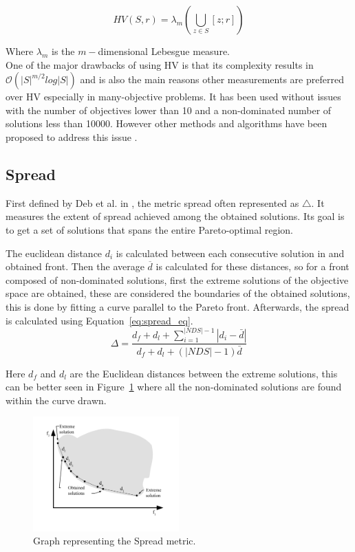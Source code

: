 \begin{equation}
H V(S, r)=\lambda_{m}\left(\bigcup_{z \in S}[z ; r]\right)
\end{equation}

Where $\lambda_m$ is the $m-$dimensional Lebesgue measure.\\

One of the major drawbacks of using HV is that its complexity results in $\mathcal{O}(|S|^{m/2}log|S|)$ and is also the main reasons other measurements are preferred over HV especially in many-objective problems. It has been used without issues with the number of objectives lower than 10 and a non-dominated number of solutions less than 10000. However other methods and algorithms have been proposed to address this issue \cite{audet2018performance}.

\subsection{Spread}

First defined by Deb et al. in \cite{zitzler2003performance}, the metric spread often represented as $\bigtriangleup$. It measures the extent of spread achieved among the obtained solutions. Its goal is to get a set of solutions that spans the entire Pareto-optimal region.

The euclidean distance $d_i$ is calculated between each consecutive solution in and obtained front. Then the average $\overline{d}$ is calculated for these distances, so for a front composed of non-dominated solutions, first the extreme solutions of the objective space are obtained, these are considered the boundaries of the obtained solutions, this is done by fitting a curve parallel to the Pareto front. Afterwards, the spread is calculated using Equation~\ref{eq:spread_eq}.\\

\begin{equation}
\Delta=\frac{d_{f}+d_{l}+\sum_{i=1}^{|N D S|-1}\left|d_{i}-\bar{d}\right|}{d_{f}+d_{l}+(|N D S|-1) \bar{d}}
\label{eq:spread_eq}
\end{equation}

Here $d_f$ and $d_l$ are the Euclidean distances between the extreme solutions, this can be better seen in Figure~\ref{fig:spread_graph} where all the non-dominated solutions are found within the curve drawn.\\

\begin{figure}
    \centering
    \includegraphics[width=0.5\textwidth]{images/spread_metric.png}
    \caption{Graph representing the Spread metric.}
    \label{fig:spread_graph}
\end{figure}

